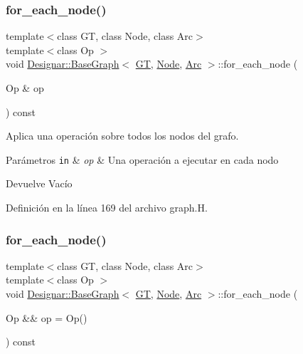 \subsubsection{\texorpdfstring{for\+\_\+each\+\_\+node()}{for\_each\_node()}\hspace{0.1cm}{\footnotesize\ttfamily [1/2]}}
{\footnotesize\ttfamily template$<$class GT, class Node, class Arc$>$ \\
template$<$class Op $>$ \\
void \hyperlink{class_designar_1_1_base_graph}{Designar\+::\+Base\+Graph}$<$ \hyperlink{demo-buildgraph_8_c_a3001c40d2c31ca87ed96cd7d1334a55e}{GT}, \hyperlink{namespace_designar_a5af326c65aa2bd26b26c410f2030d09e}{Node}, \hyperlink{namespace_designar_a3f55fb5513d62ff47cbc8f72b8e95d6f}{Arc} $>$\+::for\+\_\+each\+\_\+node (\begin{DoxyParamCaption}\item[{Op \&}]{op }\end{DoxyParamCaption}) const\hspace{0.3cm}{\ttfamily [inline]}}



Aplica una operación sobre todos los nodos del grafo. 


\begin{DoxyParams}[1]{Parámetros}
\mbox{\tt in}  & {\em op} & Una operación a ejecutar en cada nodo \\
\hline
\end{DoxyParams}
\begin{DoxyReturn}{Devuelve}
Vacío 
\end{DoxyReturn}


Definición en la línea 169 del archivo graph.\+H.

\mbox{\label{class_designar_1_1_base_graph_aab8f765719514803f426b03939f519a1}} 
\subsubsection{\texorpdfstring{for\+\_\+each\+\_\+node()}{for\_each\_node()}\hspace{0.1cm}{\footnotesize\ttfamily [2/2]}}
{\footnotesize\ttfamily template$<$class GT, class Node, class Arc$>$ \\
template$<$class Op $>$ \\
void \hyperlink{class_designar_1_1_base_graph}{Designar\+::\+Base\+Graph}$<$ \hyperlink{demo-buildgraph_8_c_a3001c40d2c31ca87ed96cd7d1334a55e}{GT}, \hyperlink{namespace_designar_a5af326c65aa2bd26b26c410f2030d09e}{Node}, \hyperlink{namespace_designar_a3f55fb5513d62ff47cbc8f72b8e95d6f}{Arc} $>$\+::for\+\_\+each\+\_\+node (\begin{DoxyParamCaption}\item[{Op \&\&}]{op = {\ttfamily Op()} }\end{DoxyParamCaption}) const\hspace{0.3cm}{\ttfamily [inline]}}



